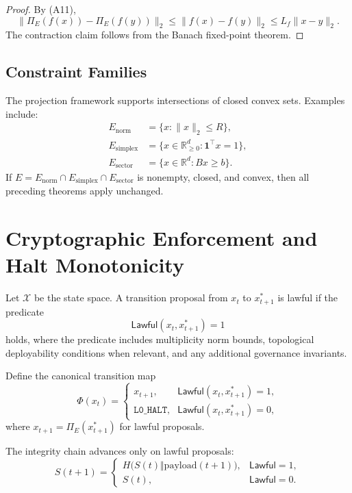 \documentclass[11pt]{article}
\begin{document}
\begin{proof}
By (A11),
\[
\|\Pi_E(f(x)) - \Pi_E(f(y))\|_2 \le \|f(x)-f(y)\|_2 \le L_f\|x-y\|_2. \tag{A15}
\]
The contraction claim follows from the Banach fixed-point theorem.
\end{proof}

\subsection{Constraint Families}
The projection framework supports intersections of closed convex sets. Examples include:
\begin{align}
E_{\mathrm{norm}} &= \{x : \|x\|_2 \le R\}, \tag{A16}\\
E_{\mathrm{simplex}} &= \{x \in \mathbb{R}^d_{\ge 0} : \mathbf{1}^\top x = 1\}, \tag{A17}\\
E_{\mathrm{sector}} &= \{x \in \mathbb{R}^d : Bx \ge b\}. \tag{A18}
\end{align}
If \(E = E_{\mathrm{norm}} \cap E_{\mathrm{simplex}} \cap E_{\mathrm{sector}}\) is nonempty, closed, and convex, then all preceding theorems apply unchanged.

\section{Cryptographic Enforcement and Halt Monotonicity}
\begin{definition}
Let \(\mathcal{X}\) be the state space. A transition proposal from \(x_t\) to \(x_{t+1}^{\ast}\) is lawful if the predicate
\[
\mathsf{Lawful}(x_t, x_{t+1}^{\ast}) = 1 \tag{A19}
\]
holds, where the predicate includes multiplicity norm bounds, topological deployability conditions when relevant, and any additional governance invariants.
\end{definition}

\begin{definition}
Define the canonical transition map
\[
\Phi(x_t) =
\begin{cases}
 x_{t+1}, & \mathsf{Lawful}(x_t, x_{t+1}^{\ast}) = 1,\\
 \texttt{L0\_HALT}, & \mathsf{Lawful}(x_t, x_{t+1}^{\ast}) = 0,
\end{cases} \tag{A20}
\]
where \(x_{t+1}=\Pi_E(x_{t+1}^{\ast})\) for lawful proposals.
\end{definition}

\begin{definition}
The integrity chain advances only on lawful proposals:
\[
S(t+1)=
\begin{cases}
H\big(S(t) \Vert \mathrm{payload}(t+1)\big), & \mathsf{Lawful}=1,\\
S(t), & \mathsf{Lawful}=0.
\end{cases} \tag{A21}
\]
\end{definition}
\end{document}
